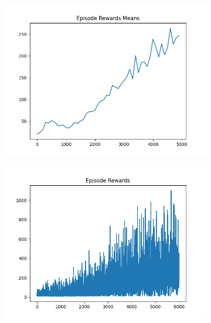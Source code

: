 \begin{figure}[H]
\begin{subfigure}{.47\linewidth}
        \includegraphics[width=\textwidth]{pole/2024-06-13_21-45-52_dqn_cartpole_episode_rewards_means.png}
    \end{subfigure}
    \begin{subfigure}{.47\linewidth}
        \centering
        \includegraphics[width=\textwidth]{pole/2024-06-13_22-09-48_dqn_cartpole_episode_rewards.png}
    \end{subfigure}
\end{figure}

